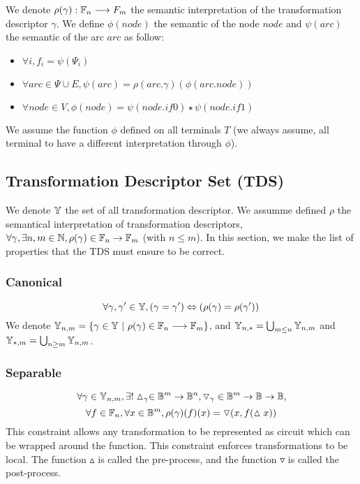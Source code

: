 \documentclass[a4paper,10pt]{article}
\begin{document}
We denote $\rho(\gamma) : \mathbb{F}_n \longrightarrow F_m$ the semantic interpretation of the transformation descriptor $\gamma$.
We define $\phi(node)$ the semantic of the node $node$ and $\psi(arc)$ the semantic of the arc $arc$ as follow:\begin{itemize}
\item $\forall i, f_i = \psi(\Psi_i)$
\item $\forall arc \in \Psi \cup E, \psi(arc) = \rho(arc.\gamma)(\phi(arc.node))$
\item $\forall node \in V, \phi(node) = \psi(node.if0) \star \psi(node.if1)$
\end{itemize}
We assume the function $\phi$ defined on all terminals $T$ (we always assume, all terminal to have a different interpretation through $\phi$).

\subsection{Transformation Descriptor Set (TDS)}

We denote $\mathbb{Y}$ the set of all transformation descriptor.
We assumme defined $\rho$ the semantical interpretation of transformation descriptors, $\forall \gamma, \exists n, m \in\mathbb{N}, \rho(\gamma) \in \mathbb{F}_n \rightarrow \mathbb{F}_m$ (with $n\leq m$).
In this section, we make the list of properties that the TDS must ensure to be correct.

\subsubsection{Canonical}
\[\forall \gamma, \gamma' \in \mathbb{Y}, \left( \gamma = \gamma' \right) \Leftrightarrow \left( \rho(\gamma) = \rho(\gamma') \right) \]
We denote $\mathbb{Y}_{n, m} = \{ \gamma \in \mathbb{Y} ~|~ \rho(\gamma) \in \mathbb{F}_n \longrightarrow \mathbb{F}_m \}$, and $\mathbb{Y}_{n,*} = \bigcup_{m\leq n} \mathbb{Y}_{n, m}$ and $\mathbb{Y}_{*, m} = \bigcup_{n \geq m} \mathbb{Y}_{n, m}$.

\subsubsection{Separable}
\[\forall \gamma \in \mathbb{Y}_{n, m}, \exists! \vartriangle_\gamma \in \mathbb{B}^m \rightarrow \mathbb{B}^n, \triangledown_\gamma \in \mathbb{B}^m \rightarrow \mathbb{B} \rightarrow \mathbb{B},\]
\[\forall f\in \mathbb{F}_n, \forall x \in \mathbb{B}^m, \rho(\gamma)(f)(x) = \triangledown(x, f(\vartriangle x))\]
This constraint allows any transformation to be represented as circuit which can be wrapped around the function.
This constraint enforces transformations to be local.
The function $\vartriangle$ is called the pre-process, and the function $\triangledown$ is called the post-process.
\end{document}

